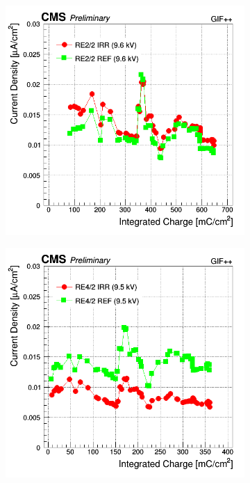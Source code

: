	\begin{figure}[H]
    	\begin{subfigure}{0.5\linewidth}
    		\centering
			\includegraphics[width = \linewidth]{fig/chapt5/RE2-2-Source-Current-vs-Time-9600.png}
        	\caption{\label{fig:GIFpp-Source-mon:A}}
    	\end{subfigure}
    	\begin{subfigure}{0.5\linewidth}
			\centering
    		\includegraphics[width = \linewidth]{fig/chapt5/RE4-2-Source-Current-vs-Time-9500.png}

\end{subfigure}
\end{figure}

